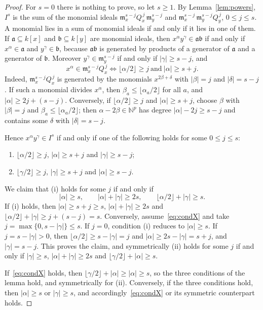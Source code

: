 \documentclass{amsart}
\theoremstyle{definition}
\theoremstyle{remark}
\numberwithin{equation}{section}
\newcommand{\NN}{\mathbb{N}}
\newcommand{\mm}{\mathfrak{m}}
\newcommand{\fl}[1]{\lfloor #1\rfloor}
\begin{document}
\begin{proof}
For $s=0$ there is nothing to prove, so let $s\ge1$. By
Lemma~\ref{lem:powers}, $I^s$ is the sum of the monomial ideals
$\mm_x^{s-j}Q_x^{\,j}\,\mm_y^{s-j}$ and $\mm_x^{s-j}\,\mm_y^{s-j}Q_y^{\,j}$,
$0\le j\le s$. A monomial lies in a sum of monomial ideals if and only if it lies
in one of them. If $\mathfrak a\subseteq k[x]$ and $\mathfrak b\subseteq k[y]$
are monomial ideals, then $x^\alpha y^\gamma\in\mathfrak a\mathfrak b$ if and
only if $x^\alpha\in\mathfrak a$ and $y^\gamma\in\mathfrak b$, because
$\mathfrak a\mathfrak b$ is generated by products of a generator of $\mathfrak
a$ and a generator of $\mathfrak b$. Moreover $y^\gamma\in\mm_y^{s-j}$ if and
only if $|\gamma|\ge s-j$, and
\[
  x^\alpha\in\mm_x^{s-j}Q_x^{\,j}\iff \fl{\alpha/2}\ge j\ \text{and}\ |\alpha|\ge s+j.
\]
Indeed, $\mm_x^{s-j}Q_x^{\,j}$ is generated by the monomials
$x^{2\beta+\delta}$ with $|\beta|=j$ and $|\delta|=s-j$. If such a monomial
divides $x^\alpha$, then $\beta_a\le\fl{\alpha_a/2}$ for all $a$, and
$|\alpha|\ge2j+(s-j)$. Conversely, if $\fl{\alpha/2}\ge j$ and $|\alpha|\ge s+j$,
choose $\beta$ with $|\beta|=j$ and $\beta_a\le\fl{\alpha_a/2}$; then
$\alpha-2\beta\in\NN^p$ has degree $|\alpha|-2j\ge s-j$ and contains some
$\delta$ with $|\delta|=s-j$.

Hence $x^\alpha y^\gamma\in I^s$ if and only if one of the following holds for
some $0\le j\le s$:
\begin{enumerate}[label=(\roman*)]
\item $\fl{\alpha/2}\ge j$, $|\alpha|\ge s+j$ and $|\gamma|\ge s-j$;
\item $\fl{\gamma/2}\ge j$, $|\gamma|\ge s+j$ and $|\alpha|\ge s-j$.
\end{enumerate}
We claim that (i) holds for some $j$ if and only if
\begin{equation}\label{eq:condX}
  |\alpha|\ge s,\qquad |\alpha|+|\gamma|\ge2s,\qquad \fl{\alpha/2}+|\gamma|\ge s.
\end{equation}
If (i) holds, then $|\alpha|\ge s+j\ge s$, $|\alpha|+|\gamma|\ge2s$ and
$\fl{\alpha/2}+|\gamma|\ge j+(s-j)=s$. Conversely, assume~\eqref{eq:condX} and
take $j=\max\{0,s-|\gamma|\}\le s$. If $j=0$, condition (i) reduces to
$|\alpha|\ge s$. If $j=s-|\gamma|>0$, then $\fl{\alpha/2}\ge s-|\gamma|=j$ and
$|\alpha|\ge2s-|\gamma|=s+j$, and $|\gamma|=s-j$. This proves the claim, and
symmetrically (ii) holds for some $j$ if and only if $|\gamma|\ge s$,
$|\alpha|+|\gamma|\ge2s$ and $\fl{\gamma/2}+|\alpha|\ge s$.

If~\eqref{eq:condX} holds, then $\fl{\gamma/2}+|\alpha|\ge|\alpha|\ge s$, so the
three conditions of the lemma hold, and symmetrically for (ii). Conversely, if
the three conditions hold, then $|\alpha|\ge s$ or $|\gamma|\ge s$, and
accordingly~\eqref{eq:condX} or its symmetric counterpart holds.
\end{proof}
\end{document}
